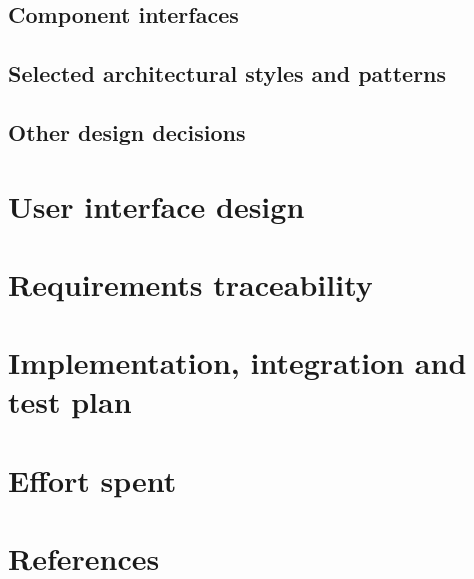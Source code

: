 \documentclass[12pt, a4paper]{report}
\begin{document}
    \section{Component interfaces}
    \section{Selected architectural styles and patterns}
    \section{Other design decisions}

\newpage 

\chapter{User interface design}

\newpage 

\chapter{Requirements traceability}

\newpage 

\chapter{Implementation, integration and test plan}

\newpage 

\chapter{Effort spent}

\newpage 

\chapter{References}
\end{document}
